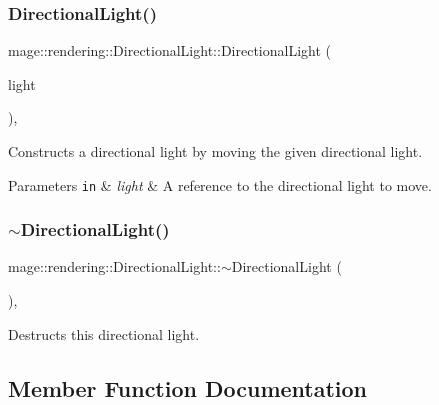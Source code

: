 \subsubsection{\texorpdfstring{Directional\+Light()}{DirectionalLight()}\hspace{0.1cm}{\footnotesize\ttfamily [3/3]}}
{\footnotesize\ttfamily mage\+::rendering\+::\+Directional\+Light\+::\+Directional\+Light (\begin{DoxyParamCaption}\item[{\hyperlink{classmage_1_1rendering_1_1_directional_light}{Directional\+Light} \&\&}]{light }\end{DoxyParamCaption})\hspace{0.3cm}{\ttfamily [default]}, {\ttfamily [noexcept]}}

Constructs a directional light by moving the given directional light.


\begin{DoxyParams}[1]{Parameters}
\mbox{\tt in}  & {\em light} & A reference to the directional light to move. \\
\hline
\end{DoxyParams}
\hypertarget{classmage_1_1rendering_1_1_directional_light_a0f35f25f86aeb2ae688a8918fa3d8b76}{}\label{classmage_1_1rendering_1_1_directional_light_a0f35f25f86aeb2ae688a8918fa3d8b76} 
\subsubsection{\texorpdfstring{$\sim$\+Directional\+Light()}{~DirectionalLight()}}
{\footnotesize\ttfamily mage\+::rendering\+::\+Directional\+Light\+::$\sim$\+Directional\+Light (\begin{DoxyParamCaption}{ }\end{DoxyParamCaption})\hspace{0.3cm}{\ttfamily [virtual]}, {\ttfamily [default]}}

Destructs this directional light. 

\subsection{Member Function Documentation}
\hypertarget{classmage_1_1rendering_1_1_directional_light_a7b0b25df35d2c1121bf08cb0a733b858}{}\label{classmage_1_1rendering_1_1_directional_light_a7b0b25df35d2c1121bf08cb0a733b858} 
